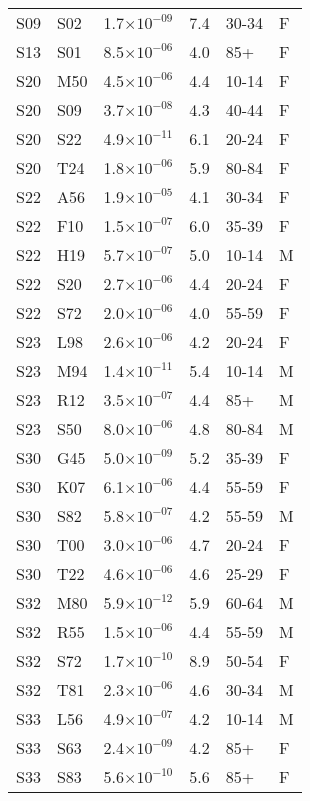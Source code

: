 \begin{longtable}{lllrll}
   S09 & S02 & 1.7$\times10^{-09}$ & 7.4 & 30-34 & F \\ 
   S13 & S01 & 8.5$\times10^{-06}$ & 4.0 & 85+ & F \\ 
   S20 & M50 & 4.5$\times10^{-06}$ & 4.4 & 10-14 & F \\ 
   S20 & S09 & 3.7$\times10^{-08}$ & 4.3 & 40-44 & F \\ 
   S20 & S22 & 4.9$\times10^{-11}$ & 6.1 & 20-24 & F \\ 
   S20 & T24 & 1.8$\times10^{-06}$ & 5.9 & 80-84 & F \\ 
   S22 & A56 & 1.9$\times10^{-05}$ & 4.1 & 30-34 & F \\ 
   S22 & F10 & 1.5$\times10^{-07}$ & 6.0 & 35-39 & F \\ 
   S22 & H19 & 5.7$\times10^{-07}$ & 5.0 & 10-14 & M \\ 
   S22 & S20 & 2.7$\times10^{-06}$ & 4.4 & 20-24 & F \\ 
   S22 & S72 & 2.0$\times10^{-06}$ & 4.0 & 55-59 & F \\ 
   S23 & L98 & 2.6$\times10^{-06}$ & 4.2 & 20-24 & F \\ 
   S23 & M94 & 1.4$\times10^{-11}$ & 5.4 & 10-14 & M \\ 
   S23 & R12 & 3.5$\times10^{-07}$ & 4.4 & 85+ & M \\ 
   S23 & S50 & 8.0$\times10^{-06}$ & 4.8 & 80-84 & M \\ 
   S30 & G45 & 5.0$\times10^{-09}$ & 5.2 & 35-39 & F \\ 
   S30 & K07 & 6.1$\times10^{-06}$ & 4.4 & 55-59 & F \\ 
   S30 & S82 & 5.8$\times10^{-07}$ & 4.2 & 55-59 & M \\ 
   S30 & T00 & 3.0$\times10^{-06}$ & 4.7 & 20-24 & F \\ 
   S30 & T22 & 4.6$\times10^{-06}$ & 4.6 & 25-29 & F \\ 
   S32 & M80 & 5.9$\times10^{-12}$ & 5.9 & 60-64 & M \\ 
   S32 & R55 & 1.5$\times10^{-06}$ & 4.4 & 55-59 & M \\ 
   S32 & S72 & 1.7$\times10^{-10}$ & 8.9 & 50-54 & F \\ 
   S32 & T81 & 2.3$\times10^{-06}$ & 4.6 & 30-34 & M \\ 
   S33 & L56 & 4.9$\times10^{-07}$ & 4.2 & 10-14 & M \\ 
   S33 & S63 & 2.4$\times10^{-09}$ & 4.2 & 85+ & F \\ 
   S33 & S83 & 5.6$\times10^{-10}$ & 5.6 & 85+ & F \\ 

\end{longtable}
